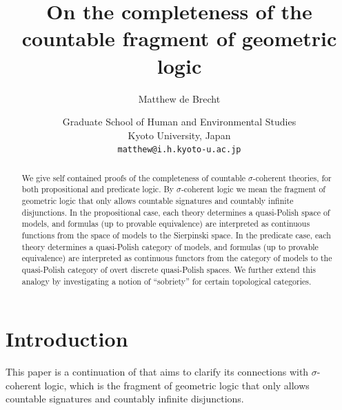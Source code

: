 \documentclass{article}
\theoremstyle{plain}
\begin{document}

\title{On the completeness of the countable fragment of geometric logic}

\author{Matthew de Brecht}
\date{Graduate School of Human and Environmental Studies\\ Kyoto University, Japan\\\texttt{matthew@i.h.kyoto-u.ac.jp}}




\maketitle

\begin{abstract}
We give self contained proofs of the completeness of countable $\sigma$-coherent theories, for both propositional and predicate logic. By $\sigma$-coherent logic we mean the fragment of geometric logic that only allows countable signatures and countably infinite disjunctions. In the propositional case, each theory determines a quasi-Polish space of models, and formulas (up to provable equivalence) are interpreted as continuous functions from the space of models to the Sierpinski space.  In the predicate case, each theory determines a quasi-Polish category of models, and formulas (up to provable equivalence) are interpreted as continuous functors from the category of models to the quasi-Polish category of overt discrete quasi-Polish spaces. We further extend this analogy by investigating a notion of ``sobriety'' for certain topological categories.
\end{abstract}



\section{Introduction}

This paper is a continuation of \cite{dbr26} that aims to clarify its connections with $\sigma$-coherent logic, which is the fragment of geometric logic that only allows countable signatures and countably infinite disjunctions. 
\end{document}
